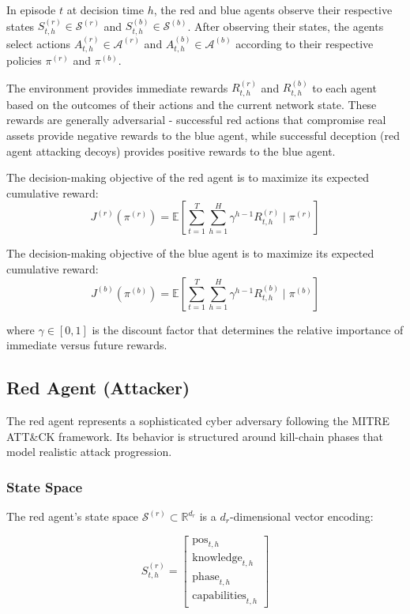 \documentclass[11pt]{article}
\newcounter{phase}[algorithm]
\theoremstyle{definition}
\theoremstyle{plain}
\newcommand{\MC}[1]{\mathcal{#1}}
\newcommand{\EE}{\mathbb{E}}
\begin{document}
In episode $t$ at decision time $h$, the red and blue agents observe their respective states $S_{t,h}^{(r)} \in \MC{S}^{(r)}$ and $S_{t,h}^{(b)} \in \MC{S}^{(b)}$. After observing their states, the agents select actions $A_{t,h}^{(r)} \in \MC{A}^{(r)}$ and $A_{t,h}^{(b)} \in \MC{A}^{(b)}$ according to their respective policies $\pi^{(r)}$ and $\pi^{(b)}$.

The environment provides immediate rewards $R_{t,h}^{(r)}$ and $R_{t,h}^{(b)}$ to each agent based on the outcomes of their actions and the current network state. These rewards are generally adversarial - successful red actions that compromise real assets provide negative rewards to the blue agent, while successful deception (red agent attacking decoys) provides positive rewards to the blue agent.

The decision-making objective of the red agent is to maximize its expected cumulative reward:
\begin{equation}
J^{(r)}(\pi^{(r)}) = \EE\left[\sum_{t=1}^{T} \sum_{h=1}^{H} \gamma^{h-1} R_{t,h}^{(r)} \mid \pi^{(r)}\right]
\end{equation}

The decision-making objective of the blue agent is to maximize its expected cumulative reward:
\begin{equation}
J^{(b)}(\pi^{(b)}) = \EE\left[\sum_{t=1}^{T} \sum_{h=1}^{H} \gamma^{h-1} R_{t,h}^{(b)} \mid \pi^{(b)}\right]
\end{equation}

where $\gamma \in [0,1]$ is the discount factor that determines the relative importance of immediate versus future rewards.

\subsection{Red Agent (Attacker)}

The red agent represents a sophisticated cyber adversary following the MITRE ATT\&CK framework. Its behavior is structured around kill-chain phases that model realistic attack progression.

\subsubsection{State Space}
The red agent's state space $\MC{S}^{(r)} \subset \mathbb{R}^{d_r}$ is a $d_r$-dimensional vector encoding:

\begin{equation}
S_{t,h}^{(r)} = \begin{bmatrix}
\text{pos}_{t,h} \\
\text{knowledge}_{t,h} \\
\text{phase}_{t,h} \\
\text{capabilities}_{t,h}
\end{bmatrix}
\end{equation}
\end{document}
